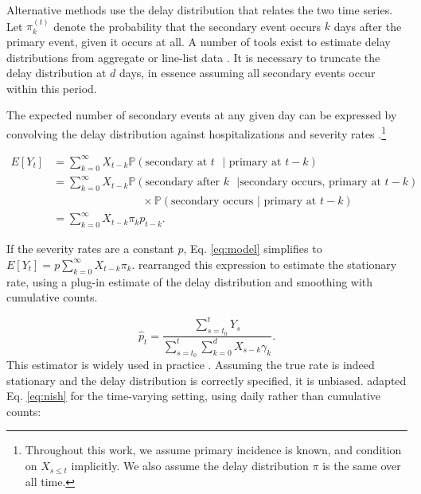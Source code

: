 \documentclass{article}
\begin{document}
Alternative methods use the delay distribution that relates the two time series. Let $\pi_k^{(t)}$ denote the probability that the secondary event occurs $k$ days after the primary event, given it occurs at all. A number of tools exist to estimate delay distributions from aggregate or line-list data \citep{delay_distrs}. It is necessary to truncate the delay distribution at $d$ days, in essence assuming all secondary events occur within this period. 

The expected number of secondary events at any given day can be expressed by convolving the delay distribution against hospitalizations and severity rates \citep{fusedlasso,nishiura}.\footnote{Throughout this work, we assume primary incidence is known, and condition on $X_{s\leq t}$ implicitly. We also assume the delay distribution $\pi$ is the same over all time.}

\begin{align}\label{eq:model}
    E[Y_t] &= \sum_{k=0}^\infty X_{t-k} \mathbb{P}(\text{secondary at $t$ }\vert\text{ primary at }t-k) \nonumber \\
            &= \sum_{k=0}^\infty X_{t-k} \mathbb{P}(\text{secondary after $k$ }\vert\text{secondary occurs, primary at }t-k) \nonumber \\
    &\qquad\qquad\qquad\qquad\times\mathbb{P}(\text{secondary occurs }\vert\text{ primary at $t-k$}) \nonumber \\
    &= \sum_{k=0}^\infty X_{t-k} \pi_k p_{t-k}.%
\end{align}

\noindent If the severity rates are a constant $p$, Eq. \ref{eq:model} simplifies to $E[Y_t] = p\sum_{k=0}^\infty X_{t-k}\pi_k$. \citet{nishiura} rearranged this expression to estimate the stationary rate, using a plug-in estimate of the delay distribution and smoothing with cumulative counts.

\begin{equation}\label{eq:nish}
    \hat{p}_t = \frac{\sum_{s=t_0}^t Y_s}{\sum_{s=t_0}^t \sum_{k=0}^d X_{s-k}\gamma_k}.
\end{equation}
This estimator is widely used in practice \citep{nishiuraEx1, nishiuraEx2, Russell2020}. Assuming the true rate is indeed stationary and the delay distribution is correctly specified, it is unbiased. \citet{UKpaper} adapted Eq. \ref{eq:nish} for the time-varying setting, using daily rather than cumulative counts:
\end{document}
